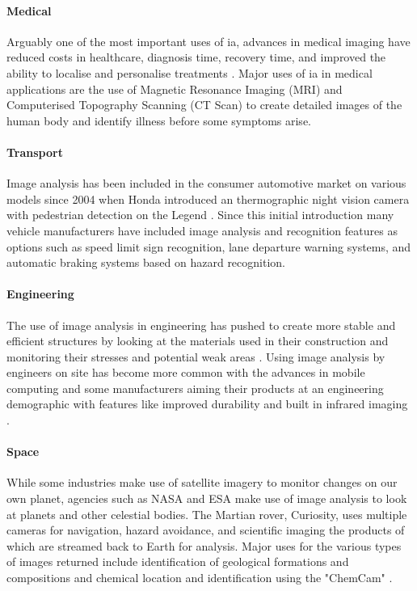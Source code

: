 	\paragraph{Medical}
	Arguably one of the most important uses of \gls{ia}, advances in medical imaging have reduced costs in healthcare, diagnosis time, recovery time, and improved the ability to localise and personalise treatments \citep{esfmedical}. Major uses of \gls{ia} in medical applications are the use of Magnetic Resonance Imaging (MRI) and Computerised Topography Scanning (CT Scan) to create detailed images of the human body and identify illness before some symptoms arise.
	\paragraph{Transport}
	Image analysis has been included in the consumer automotive market on various models since 2004 when Honda introduced an thermographic night vision camera with pedestrian detection on the Legend  \citep{hondanightvision}. Since this initial introduction many vehicle manufacturers have included image analysis and recognition features as options such as speed limit sign recognition, lane departure warning systems, and automatic braking systems based on hazard recognition.
	\paragraph{Engineering}
	The use of image analysis in engineering has pushed to create more stable and efficient structures by looking at the materials used in their construction \citep{concreteanalysis} and monitoring their stresses and potential weak areas \citep{bridgecables}. Using image analysis by engineers on site has become more common with the advances in mobile computing and some manufacturers aiming their products at an engineering demographic with features like improved durability and built in infrared imaging \citep{catphone}.
	\paragraph{Space}
	While some industries make use of satellite imagery to monitor changes on our own planet, agencies such as NASA and ESA make use of image analysis to look at planets and other celestial bodies. The Martian rover, Curiosity, uses multiple cameras for navigation, hazard avoidance, and scientific imaging the products of which are streamed back to Earth for analysis. Major uses for the various types of images returned include identification of geological formations and compositions \citep{curiositysand, curiositygravel} and chemical location and identification using the "ChemCam" \citep{curiosityhydrogen}.
